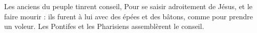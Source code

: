 Les anciens du peuple tinrent conseil, 
Pour se saisir adroitement de Jésus, et le faire mourir : 
ils furent à lui avec des épées et des bâtons, comme pour prendre un voleur.
\versseparator
Les Pontifes et les Pharisiens assemblèrent le conseil.